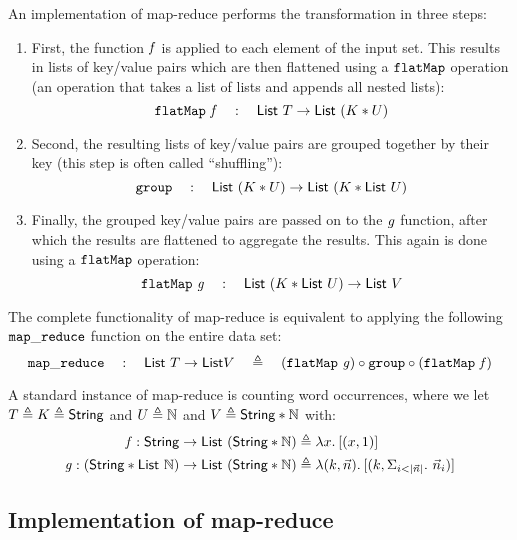 \noindent
An implementation of map-reduce performs the transformation in three steps:
\begin{enumerate}
\item First, the function $\mathit{f}$ is applied to each element of the input set.
  This results in lists of key/value pairs which are then flattened
  using a $\mathtt{flatMap}$ operation (an operation that takes a list of lists and appends all nested lists):
  \[
  \mathtt{flatMap}\ \mathit{f} \quad:\quad
  \mathsf{List}\ T \to \mathsf{List}\ (K * U)
  \]
\item Second, the resulting lists of key/value pairs are grouped together by
  their key (this step is often called ``shuffling''):
  \[
  \groupname \quad:\quad
  \List\ (\tvarK * \tvarB) \to \List\ (\tvarK * \List\ \tvarB)
  \]
\item Finally, the grouped key/value pairs are passed on to the $\mathit{g}$
  function, after which the results are flattened to aggregate the results.
  This again is done using a $\mathtt{flatMap}$ operation:
  \[
  \mathtt{flatMap}\ \mathit{g} \quad:\quad
  \mathsf{List}\ (K * \mathsf{List}\ U) \to \mathsf{List}\ V
  \]
\end{enumerate}

\noindent
The complete functionality of map-reduce is equivalent to applying the following
$\mathtt{map\_reduce}$ function on the entire data set:
\[
  \mapreducename\quad
  :
  \quad
  \List\ \tvar \to \List \tvarC
  \quad \eqdef \quad
      (\flatmapname\ \redvar) \circ \groupname \circ (\flatmapname\ \mapvar)
\]

\noindent
A standard instance of map-reduce is counting word occurrences, where we let
$T \triangleq K \triangleq \mathsf{String}$ and $U \triangleq \mathbb{N}$ and
$V \triangleq \mathsf{String} * \mathbb{N}$ with:
%
\begin{align*}
\mapvar : \String \to \List\ (\String * \nat) \eqdef{}&
  \Lam \var. [(\var,1)] \\
\redvar : (\String * \List\ \nat) \to \List\ (\String * \nat) \eqdef{}&
  \Lam (k,\vec n). [(k,\Sigma_{i<\listlength{\vec n}}.\ \vec n_i)]
\end{align*}

\subsection{Implementation of map-reduce}

